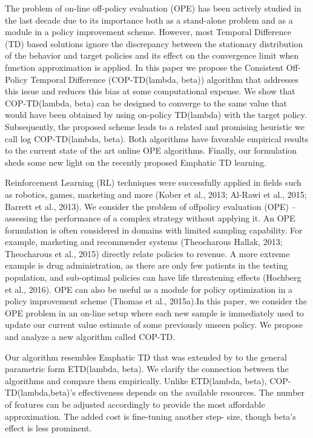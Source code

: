 \documentclass[12pt,a4paper,openright,twoside]{article}
\numberwithin{equation}{section}
\theoremstyle{definition}
\theoremstyle{remark}
\theoremstyle{plain}
\begin{document}
The problem of on-line off-policy evaluation (OPE) has been actively studied in the last decade due to its importance both as a stand-alone problem and as a module in a policy improvement scheme. However, most Temporal Difference (TD) based solutions ignore the discrepancy between the stationary distribution of the behavior and target policies and its effect on the convergence limit when function approximation is applied. In this paper we propose the Consistent Off-Policy Temporal Difference (COP-TD(lambda, beta)) algorithm that addresses this issue and reduces this bias at some computational expense. We show that COP-TD(lambda, beta) can be designed to converge to the same value that would have been obtained by using on-policy TD(lambda) with the target policy. Subsequently, the proposed scheme leads to a related and promising heuristic we call log COP-TD(lambda, beta). Both algorithms have favorable empirical results to the current state of the art online OPE algorithms. Finally, our formulation sheds some new light on the recently proposed Emphatic TD learning.

Reinforcement Learning (RL) techniques were successfully applied in fields such as robotics, games, marketing and more (Kober et al., 2013; Al-Rawi et al., 2015; Barrett et al., 2013). We consider the problem of offpolicy evaluation (OPE) – assessing the performance of a complex strategy without applying it. An OPE formulation is often considered in domains with limited sampling capability. For example, marketing and recommender systems (Theocharous  Hallak, 2013; Theocharous et al., 2015) directly relate policies to revenue. A more extreme example is drug administration, as there are only few patients in the testing population, and sub-optimal policies can have life threatening effects (Hochberg et al., 2016). OPE can also be useful as a module for policy optimization in a policy improvement scheme (Thomas et al., 2015a).In this paper, we consider the OPE problem in an on-line setup where each new sample is immediately used to update our current value estimate of some previously unseen policy. We propose and analyze a new algorithm called COP-TD.

Our algorithm resembles \cite{ETD} Emphatic TD that was extended by \cite{generalizedETD} to the general parametric form ETD(lambda, beta). We clarify the connection between the algorithms and compare them empirically. Unlike ETD(lambda, beta), COP-TD(lambda,beta)’s effectiveness depends on the available resources. The number of features can be adjusted accordingly to provide the most affordable approximation. The added cost is fine-tuning another step- size, though beta’s effect is less prominent.
\end{document}
